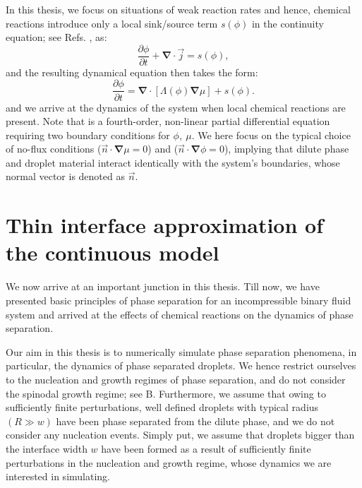 In this thesis, we focus on situations of weak reaction rates and hence, chemical reactions introduce only a local sink/source term $s(\phi)$ in the continuity equation; see Refs. \cite{Zwicker2015,Review2019}, as:
\begin{equation*}
    \frac{\partial \phi}{\partial t} + {\boldsymbol{\nabla}} \cdot \vec{j} = s(\phi),
\end{equation*}
and the resulting dynamical equation then takes the form:
\begin{equation} \label{eqn:CHActive}
   \frac{\partial \phi}{\partial t} = {\boldsymbol{\nabla}} \cdot [\Lambda(\phi) {\boldsymbol{\nabla}} \mu] + s(\phi).
\end{equation}
and we arrive at the dynamics of the system when local chemical reactions are present.
Note that  is a fourth-order, non-linear partial differential equation requiring two boundary conditions for $\phi, ~\mu$.
We here focus on the typical choice of no-flux conditions ($\vec{n} \cdot {\boldsymbol{\nabla}} \mu = 0$) and ($\vec{n} \cdot {\boldsymbol{\nabla}} \phi = 0$), implying that dilute phase and droplet material interact identically with the system's boundaries, whose normal vector is denoted as $\vec{n}$.

\section{Thin interface approximation of the continuous model}

We now arrive at an important junction in this thesis. 
Till now, we have presented basic principles of phase separation for an incompressible binary fluid system and arrived at the effects of chemical reactions on the dynamics of phase separation.

Our aim in this thesis is to numerically simulate phase separation phenomena, in particular, the dynamics of phase separated droplets.
We hence restrict ourselves to the nucleation and growth regimes of phase separation, and do not consider the spinodal growth regime; see B.
Furthermore, we assume that owing to sufficiently finite perturbations, well defined droplets with typical radius $(R \gg w)$ have been phase separated from the dilute phase, and we do not consider any nucleation events.
Simply put, we assume that droplets bigger than the interface width $w$ have been formed as a result of sufficiently finite perturbations in the nucleation and growth regime, whose dynamics we are interested in simulating.

